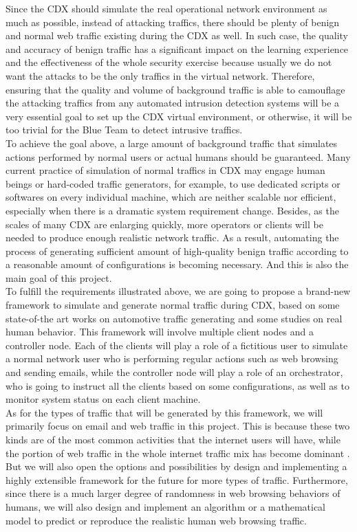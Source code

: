 \documentclass[12pt]{report}
\begin{document}
Since the CDX should simulate the real operational network environment as much as possible, instead of attacking traffics, there should be plenty of benign and normal web traffic existing during the CDX as well. In such case, the quality and accuracy of benign traffic has a significant impact on the learning experience and the effectiveness of the whole security exercise because usually we do not want the attacks to be the only traffics in the virtual network. Therefore, ensuring that the quality and volume of background traffic is able to camouflage the attacking traffics from any automated intrusion detection systems will be a very essential goal to set up the CDX virtual environment, or otherwise, it will be too trivial for the Blue Team to detect intrusive traffics.\\

To achieve the goal above, a large amount of background traffic that simulates actions performed by normal users or actual humans should be guaranteed. Many current practice of simulation of normal traffics in CDX may engage human beings or hard-coded traffic generators, for example, to use dedicated scripts or softwares on every individual machine, which are neither scalable nor efficient, especially when there is a dramatic system requirement change. Besides, as the scales of many CDX are enlarging quickly, more operators or clients will be needed to produce enough realistic network traffic. As a result, automating the process of generating sufficient amount of high-quality benign traffic according to a reasonable amount of configurations is becoming necessary. And this is also the main goal of this project.\\

To fulfill the requirements illustrated above, we are going to propose a brand-new framework to simulate and generate normal traffic during CDX, based on some state-of-the art works on automotive traffic generating and some studies on real human behavior. This framework will involve multiple client nodes and a controller node. Each of the clients will play a role of a fictitious user to simulate a normal network user who is performing regular actions such as web browsing and sending emails, while the controller node will play a role of an orchestrator, who is going to instruct all the clients based on some configurations, as well as to monitor system status on each client machine.\\

As for the types of traffic that will be generated by this framework, we will primarily focus on email and web traffic in this project. This is because these two kinds are of the most common activities that the internet users will have, while the portion of web traffic in the whole internet traffic mix has become dominant \citep{IATMA}. But we will also open the options and possibilities by design and implementing a highly extensible framework for the future for more types of traffic. Furthermore, since there is a much larger degree of randomness in web browsing behaviors of humans, we will also design and implement an algorithm or a mathematical model to predict or reproduce the realistic human web browsing traffic.\\
\end{document}
